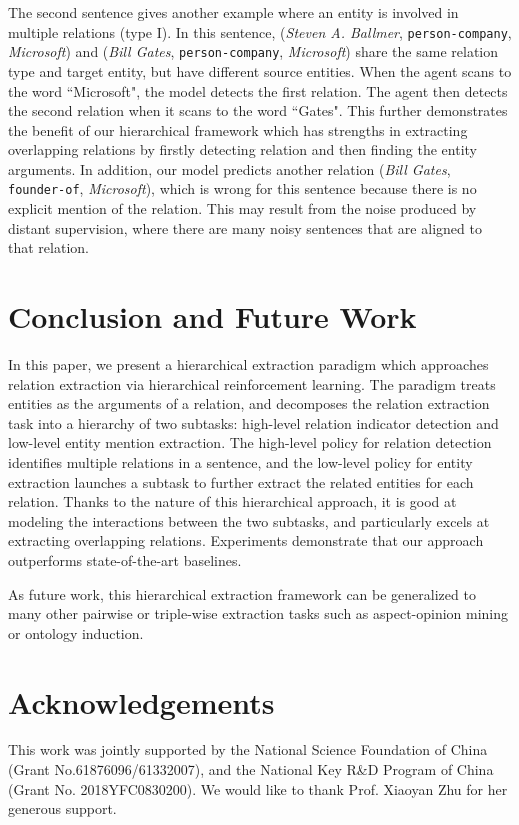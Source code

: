 \documentclass[letterpaper]{article} %
\theoremstyle{definition}
\begin{document}
The second sentence gives another example where an entity is involved in multiple relations (type I). In this sentence, (\textit{Steven A. Ballmer}, \texttt{person-company}, \textit{Microsoft}) and (\textit{Bill Gates}, \texttt{person-company}, \textit{Microsoft}) share the same relation type and target entity, but have different source entities. When the agent scans to the word ``Microsoft", the model detects the first relation. The agent then detects the second relation when it scans to the word ``Gates". This further demonstrates the benefit of our hierarchical framework which has strengths in extracting overlapping relations by firstly detecting relation and then finding the entity arguments. 
In addition, our model predicts another relation (\textit{Bill Gates}, \texttt{founder-of}, \textit{Microsoft}), which is wrong for this sentence because there is no explicit mention of the relation. This may result from the noise produced by distant supervision, where there are many noisy sentences that are aligned to that relation.

\section{Conclusion and Future Work}
In this paper, we present a hierarchical extraction paradigm which approaches relation extraction via hierarchical reinforcement learning.
The paradigm treats entities as the arguments of a relation, and decomposes the relation extraction task into a hierarchy of two subtasks: high-level relation indicator detection and low-level entity mention extraction. The high-level policy for relation detection identifies multiple relations in a sentence, and the low-level policy for entity extraction launches a subtask to further extract the related entities for each relation. 
Thanks to the nature of this hierarchical approach, it is good at modeling the interactions between the two subtasks, and particularly excels at extracting overlapping relations. 
Experiments demonstrate that our approach outperforms state-of-the-art baselines.

As future work, this hierarchical extraction framework can be generalized to many other pairwise or triple-wise extraction tasks such as aspect-opinion mining or ontology induction.

\section*{Acknowledgements}
This work was jointly supported by the National Science Foundation of China  (Grant No.61876096/61332007), and the National Key R\&D Program of China (Grant No. 2018YFC0830200). We would like to thank Prof. Xiaoyan Zhu for her generous support.



\end{document}
